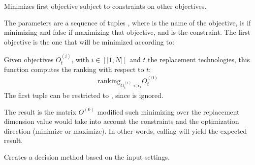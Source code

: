 \documentclass[letterpaper,10pt,english]{sphinxmanual}
\begin{document}
\begin{fulllineitems}
\label{\detokenize{api:muse.decisions.epsilon_constraints}}
Minimizes first objective subject to constraints on other objectives.

The parameters are a sequence of tuples , where
 is the name of the objective,  is  if minimizing and
false if maximizing that objective, and  is the constraint. The
first objective is the one that will be minimized according to:

Given objectives \(O^{(i)}_t\), with \(i \in [|1, N|]\) and \(t\) the
replacement technologies, this function computes the ranking with respect to
\(t\):
\begin{equation*}
\begin{split}\mathrm{ranking}_{O^{(i)}_t < \epsilon_i} O^{(0)}_t\end{split}
\end{equation*}
The first tuple can be restricted to , since  is ignored.

The result is the matrix \(O^{(0)}\) modified such minimizing over the
replacement dimension value would take into account the constraints and the
optimization direction (minimize or maximize). In other words, calling
 will yield the expected result.

\end{fulllineitems}


\begin{fulllineitems}
\label{\detokenize{api:muse.decisions.factory}}
Creates a decision method based on the input settings.

\end{fulllineitems}
\end{document}
